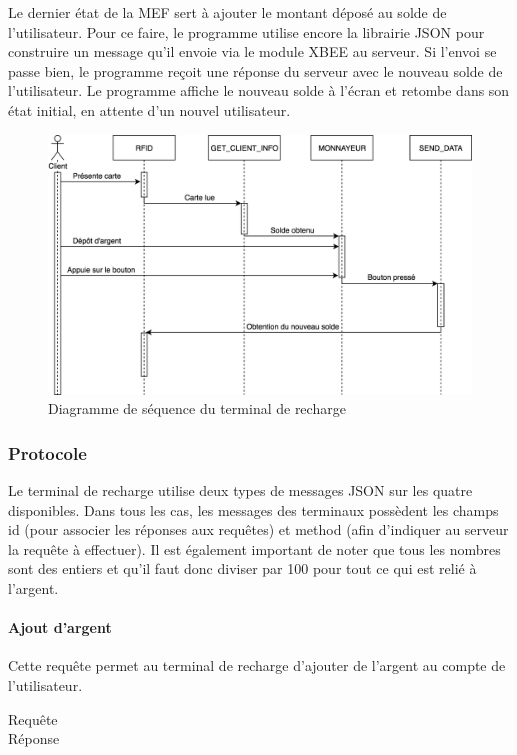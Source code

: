 		Le dernier état de la MEF sert à ajouter le montant déposé au solde de l’utilisateur. Pour ce faire, le programme utilise encore la librairie JSON pour construire un message qu’il envoie via le module XBEE au serveur. Si l’envoi se passe bien, le programme reçoit une réponse du serveur avec le nouveau solde de l’utilisateur. Le programme affiche le nouveau solde à l’écran et retombe dans son état initial, en attente d’un nouvel utilisateur.
		
		\begin{figure}[p]
			\includegraphics[width=\textwidth]{Pictures/UML/RechargeSequence}
			\caption{Diagramme de séquence du terminal de recharge}
			\label{fig.rechseq}
		\end{figure}
		
		\subsubsection{Protocole}
		Le terminal de recharge utilise deux types de messages JSON sur les quatre disponibles. Dans tous les cas, les messages des terminaux possèdent les champs \og id \fg{} (pour associer les réponses aux requêtes) et \og method \fg{} (afin d’indiquer au serveur la requête à effectuer). Il est également important de noter que tous les nombres sont des entiers et qu’il faut donc diviser par 100 pour tout ce qui est relié à l’argent.
		
			\paragraph{Ajout d'argent} Cette requête permet au terminal de recharge d’ajouter de l’argent au compte de l’utilisateur.
			\begin{multicols}{2}	
				\begin{description}
					\item[Requête]  %
					
					\item[Réponse]  %
					
				\end{description}
			\end{multicols}
			
